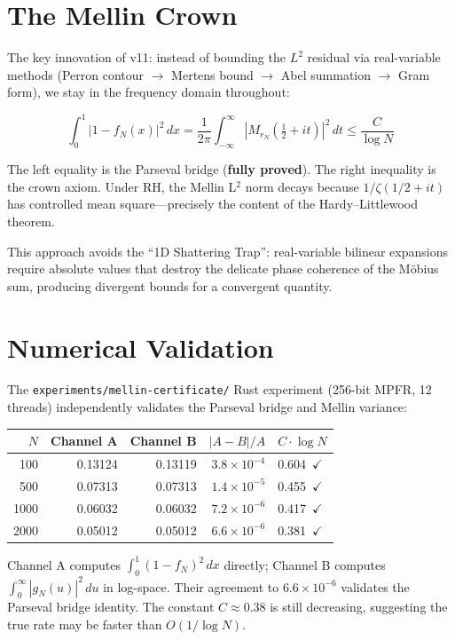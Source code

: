 \documentclass[12pt,a4paper]{article}
\begin{document}
\section{The Mellin Crown}

The key innovation of v11: instead of bounding the $L^2$ residual via
real-variable methods (Perron contour $\to$ Mertens bound $\to$ Abel summation
$\to$ Gram form), we stay in the frequency domain throughout:

\[
  \int_0^1 |1 - f_N(x)|^2\,dx
  = \frac{1}{2\pi} \int_{-\infty}^{\infty} |M_{r_N}(\tfrac{1}{2}+it)|^2\,dt
  \le \frac{C}{\log N}
\]

The left equality is the Parseval bridge (\textbf{fully proved}). The right
inequality is the crown axiom. Under RH, the Mellin L$^2$ norm decays because
$1/\zeta(1/2+it)$ has controlled mean square---precisely the content of the
Hardy--Littlewood theorem.

This approach avoids the ``1D Shattering Trap'': real-variable bilinear
expansions require absolute values that destroy the delicate phase coherence
of the M\"obius sum, producing divergent bounds for a convergent quantity.

\section{Numerical Validation}

The \texttt{experiments/mellin-certificate/} Rust experiment (256-bit MPFR,
12 threads) independently validates the Parseval bridge and Mellin variance:

\begin{center}
\begin{tabular}{@{}rrrrl@{}}
\toprule
$N$ & Channel A & Channel B & $|A-B|/A$ & $C \cdot \log N$ \\
\midrule
100 & 0.13124 & 0.13119 & $3.8\times 10^{-4}$ & 0.604~$\checkmark$ \\
500 & 0.07313 & 0.07313 & $1.4\times 10^{-5}$ & 0.455~$\checkmark$ \\
1000 & 0.06032 & 0.06032 & $7.2\times 10^{-6}$ & 0.417~$\checkmark$ \\
2000 & 0.05012 & 0.05012 & $6.6\times 10^{-6}$ & 0.381~$\checkmark$ \\
\bottomrule
\end{tabular}
\end{center}

\noindent Channel A computes $\int_0^1 (1-f_N)^2\,dx$ directly; Channel B
computes $\int_0^\infty |g_N(u)|^2\,du$ in log-space. Their agreement to
$6.6 \times 10^{-6}$ validates the Parseval bridge identity.
The constant $C \approx 0.38$ is still decreasing,
suggesting the true rate may be faster than $O(1/\log N)$.
\end{document}
